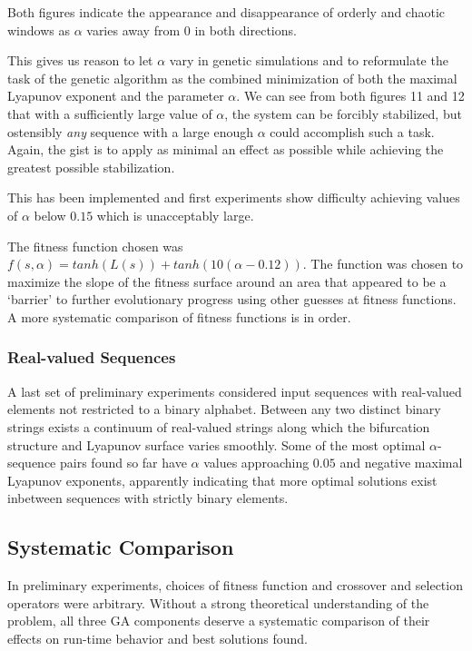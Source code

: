 \documentclass[12pt]{article}
\begin{document}
Both figures indicate the appearance and disappearance of orderly and chaotic
windows as $\alpha$ varies away from $0$ in both directions.

This gives us reason to let $\alpha$ vary in genetic simulations and to
reformulate the task of the genetic algorithm as the combined minimization of
both the maximal Lyapunov exponent and the parameter $\alpha$.  We can see
from both figures 11 and 12 that with a sufficiently large value of $\alpha$,
the system can be forcibly stabilized, but ostensibly \textit{any} sequence
with a large enough $\alpha$ could accomplish such a task.  Again, the gist
is to apply as minimal an effect as possible while achieving the greatest
possible stabilization.

This has been implemented and first experiments show difficulty achieving
values of $\alpha$ below $0.15$ which is unacceptably large.

The fitness function chosen was
$f(s, \alpha) = tanh(L(s)) + tanh(10(\alpha-0.12))$.  The function
was chosen to maximize the slope of the fitness surface around an area
that appeared to be a `barrier' to further evolutionary progress using other
guesses at fitness functions.  A more systematic comparison of fitness
functions is in order.

\subsubsection{Real-valued Sequences}
A last set of preliminary experiments considered input sequences with
real-valued elements not restricted to a binary alphabet.  Between any two
distinct binary strings exists a continuum of real-valued strings along which
the bifurcation structure and Lyapunov surface varies smoothly.  Some of the
most optimal $\alpha$-sequence pairs found so far have $\alpha$ values
approaching $0.05$ and negative maximal Lyapunov exponents, apparently
indicating that more optimal solutions exist inbetween sequences with
strictly binary elements.

\subsection{Systematic Comparison}
In preliminary experiments, choices of fitness function and crossover and
selection operators were arbitrary.
Without a strong theoretical understanding of the problem, all three GA
components deserve a
systematic comparison of their effects on run-time behavior and best
solutions found.
\end{document}
